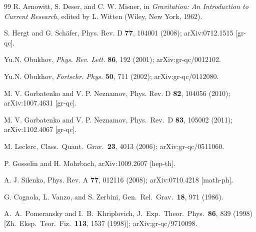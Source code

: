 \documentclass[preprint,showpacs,preprintnumbers,eqsecnum,amsmath,amssymb]{revtex4}
\begin{document}
\begin{thebibliography}{99}
R. Arnowitt, S. Deser, and C. W. Misner, in \emph{Gravitation: An
Introduction to Current Research}, edited by L. Witten (Wiley, New
York, 1962).

S. Hergt and G. Sch\"afer,
Phys. Rev. D {\bf 77}, 104001 (2008); %
arXiv:0712.1515 [gr-qc].

Yu.N. Obukhov, %
{\em Phys. Rev. Lett.} {\bf 86}, 192 (2001); %
arXiv:gr-qc/0012102.

Yu.N. Obukhov, %
{\em Fortschr. Phys.} {\bf 50}, 711 (2002); %
arXiv:gr-qc/0112080.

M. V. Gorbatenko and V. P. Neznamov, %
Phys. Rev. D \textbf{82}, 104056 (2010); %
arXiv:1007.4631 [gr-qc].

M. V. Gorbatenko and V. P. Neznamov, %
Phys.\ Rev.\ D {\bf 83}, 105002 (2011);
  arXiv:1102.4067 [gr-qc].

M. Leclerc,
  Class.\ Quant.\ Grav.\ {\bf 23}, 4013 (2006);
  arXiv:gr-qc/0511060.

P. Gosselin and H. Mohrbach, %
arXiv:1009.2607 [hep-th].

A. J. Silenko, %
Phys. Rev. A \textbf{77}, 012116 (2008); arXiv:0710.4218
[math-ph].

G. Cognola, L. Vanzo, and S. Zerbini,
Gen.\ Rel.\ Grav.\ {\bf 18}, 971 (1986). %

A.~A.~Pomeransky and I.~B.~Khriplovich,
  J.\ Exp.\ Theor.\ Phys.\ {\bf 86}, 839 (1998)
  [Zh.\ Eksp.\ Teor.\ Fiz.\ {\bf 113}, 1537 (1998)];
  arXiv:gr-qc/9710098.


\end{thebibliography}
\end{document}
